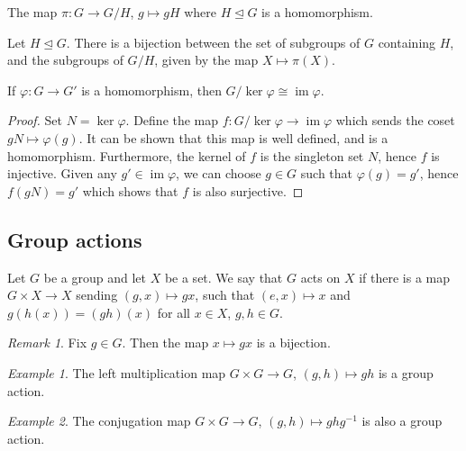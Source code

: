 \documentclass[11pt]{article}
\newcommand{\im}{\operatorname{im}}
\theoremstyle{definition}
\theoremstyle{remark}
\newtheorem*{remark}{Remark}
\newtheorem*{example}{Example}
\numberwithin{equation}{section}
\begin{document}
    \begin{lemma}
        The map $\pi\colon G \to G/H$, $g \mapsto gH$ where $H \trianglelefteq G$
        is a homomorphism.
    \end{lemma}

    \begin{theorem}[Correspondence]
        Let $H \trianglelefteq G$. There is a bijection between the set of subgroups
        of $G$ containing $H$, and the subgroups of $G / H$, given by the map $X
        \mapsto \pi(X)$.
    \end{theorem}

    \begin{theorem}
        If $\varphi\colon G \to G'$ is a homomorphism, then $G / \ker{\varphi} \cong
        \im{\varphi}$.
    \end{theorem}
    \begin{proof}
        Set $N = \ker{\varphi}$. Define the map $f\colon G / \ker{\varphi} \to
        \im{\varphi}$ which sends the coset $gN \mapsto \varphi(g)$. It can be shown
        that this map is well defined, and is a homomorphism. Furthermore, the
        kernel of $f$ is the singleton set $N$, hence $f$ is injective. Given any $g'
        \in \im{\varphi}$, we can choose $g \in G$ such that $\varphi(g) = g'$, hence
        $f(gN) = g'$ which shows that $f$ is also surjective.
    \end{proof}

    \subsection{Group actions}
    \begin{definition}
        Let $G$ be a group and let $X$ be a set. We say that $G$ acts on $X$ if there
        is a map $G\times X \to X$ sending $(g, x) \mapsto gx$, such that $(e, x)
        \mapsto x$ and $g(h(x)) = (gh)(x)$ for all $x \in X$, $g, h \in G$.
        \begin{remark}
            Fix $g \in G$. Then the map $x \mapsto gx$ is a bijection.
        \end{remark}
    \end{definition}
    \begin{example}
        The left multiplication map $G \times G \to G$, $(g, h) \mapsto gh$ is a
        group action.
    \end{example}
    \begin{example}
        The conjugation map $G \times G \to G$, $(g, h) \mapsto ghg^{-1}$ is also a
        group action.
    \end{example}
\end{document}
